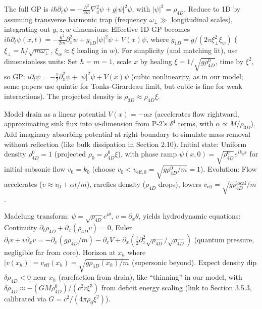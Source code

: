 \documentclass{article}
\begin{document}
The full GP is $i \hbar \partial_t \psi = -\frac{\hbar^2}{2m} \nabla_4^2 \psi + g |\psi|^2 \psi$, with $|\psi|^2 = \rho_{4D}$. Reduce to 1D by assuming transverse harmonic trap (frequency $\omega_\perp \gg$ longitudinal scales), integrating out $y,z,w$ dimensions: Effective 1D GP becomes $i \hbar \partial_t \psi(x,t) = -\frac{\hbar^2}{2m} \partial_x^2 \psi + g_{1D} |\psi|^2 \psi + V(x) \psi$, where $g_{1D} = g / (2\pi \xi_\perp^2 \xi_w)$ ($\xi_\perp = \hbar / \sqrt{m \omega_\perp}$, $\xi_w \approx \xi$ healing in $w$). For simplicity (and matching lit), use dimensionless units: Set $\hbar = m = 1$, scale $x$ by healing $\xi = 1 / \sqrt{g \rho_{4D}^0}$, time by $\xi^2$, so GP: $i \partial_t \psi = -\frac{1}{2} \partial_x^2 \psi + |\psi|^2 \psi + V(x) \psi$ (cubic nonlinearity, as in our model; some papers use quintic for Tonks-Girardeau limit, but cubic is fine for weak interactions). The projected density is $\rho_{3D} \approx \rho_{4D} \xi$.

Model drain as a linear potential $V(x) = -\alpha x$ (accelerates flow rightward, approximating sink flux into $w$-dimension from P-2's $\delta^4$ terms, with $\alpha \propto \dot{M} / \rho_{3D}$). Add imaginary absorbing potential at right boundary to simulate mass removal without reflection (like bulk dissipation in Section 2.10). Initial state: Uniform density $\rho_{4D}^0 = 1$ (projected $\rho_0 = \rho_{4D}^0 \xi$), with phase ramp $\psi(x,0) = \sqrt{\rho_{4D}^0} e^{i k_0 x}$ for initial subsonic flow $v_0 = k_0$ (choose $v_0 < v_{\text{eff},0} = \sqrt{g \rho_{4D}^0 / m} = 1$). Evolution: Flow accelerates ($v \approx v_0 + \alpha t / m$), rarefies density ($\rho_{4D}$ drops), lowers $v_{\text{eff}} = \sqrt{g \rho_{4D}^{\text{local}} / m}$.

Madelung transform: $\psi = \sqrt{\rho_{4D}} e^{i \theta}$, $v = \partial_x \theta$, yields hydrodynamic equations: Continuity $\partial_t \rho_{4D} + \partial_x (\rho_{4D} v) = 0$, Euler $\partial_t v + v \partial_x v = -\partial_x (g \rho_{4D} / m) - \partial_x V + \partial_x (\frac{1}{2} \partial_x^2 \sqrt{\rho_{4D}} / \sqrt{\rho_{4D}})$ (quantum pressure, negligible far from core). Horizon at $x_h$ where $|v(x_h)| = v_{\text{eff}}(x_h) = \sqrt{g \rho_{4D}(x_h) / m}$ (supersonic beyond). Expect density dip $\delta \rho_{4D} < 0$ near $x_h$ (rarefaction from drain), like ``thinning'' in our model, with $\delta \rho_{4D} \approx - (G M \rho_{4D}^0) / (c^2 r \xi^3)$ from deficit energy scaling (link to Section 3.5.3, calibrated via $G = c^2 / (4\pi \rho_0 \xi^2)$).
\end{document}
